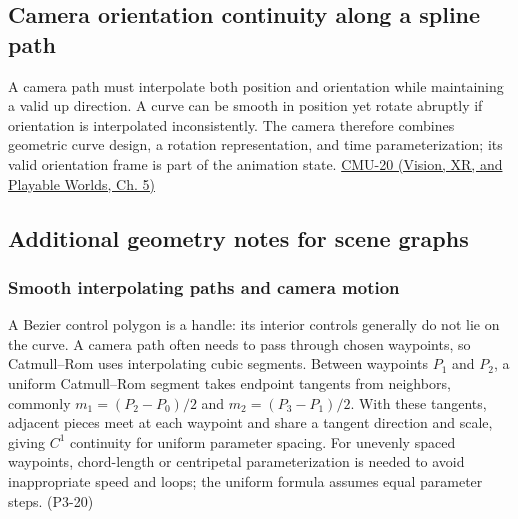 \subsection{Camera orientation continuity along a spline path}\label{04-visual-computing-ii-ch029-camera-orientation-continuity-along-a-spline-path}

\hypertarget{04-visual-computing-ii-ch029-camera-orientation-continuity-along-a-spline-path}{}

A camera path must interpolate both position and orientation while maintaining a valid up direction. A curve can be smooth in position yet rotate abruptly if orientation is interpolated inconsistently. The camera therefore combines geometric curve design, a rotation representation, and time parameterization; its valid orientation frame is part of the animation state. \href{../07-Vision-XR-and-Playable-Worlds/main.pdf\#nameddest=04-visual-computing-ii-ch036-cmu-20---introduction-to-animation}{CMU-20 (Vision, XR, and Playable Worlds, Ch. 5)}

\subsection{Additional geometry notes for scene graphs}\label{04-visual-computing-ii-ch029-additional-geometry-notes-for-scene-graphs}

\hypertarget{04-visual-computing-ii-ch029-additional-geometry-notes-for-scene-graphs}{}

\subsubsection{Smooth interpolating paths and camera motion}\label{04-visual-computing-ii-ch029-smooth-interpolating-paths-and-camera-motion}

\hypertarget{04-visual-computing-ii-ch029-smooth-interpolating-paths-and-camera-motion}{}

A Bezier control polygon is a handle: its interior controls generally do not lie on the curve. A camera path often needs to pass through chosen waypoints, so Catmull--Rom uses interpolating cubic segments. Between waypoints \(P_1\) and \(P_2\), a uniform Catmull--Rom segment takes endpoint tangents from neighbors, commonly \(m_1=(P_2-P_0)/2\) and \(m_2=(P_3-P_1)/2\). With these tangents, adjacent pieces meet at each waypoint and share a tangent direction and scale, giving \(C^1\) continuity for uniform parameter spacing. For unevenly spaced waypoints, chord-length or centripetal parameterization is needed to avoid inappropriate speed and loops; the uniform formula assumes equal parameter steps. (P3-20)

